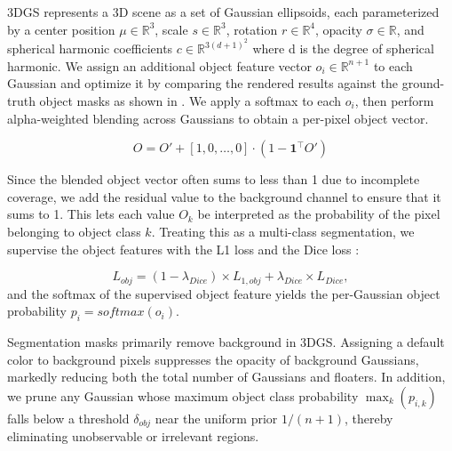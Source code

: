\ac{3DGS} represents a 3D scene as a set of Gaussian ellipsoids, each parameterized by a center position $\mu \in \mathbb{R}^{3}$, scale $s \in \mathbb{R}^{3}$, rotation $r \in \mathbb{R}^{4}$, opacity $\sigma \in \mathbb{R}$, and spherical harmonic coefficients $c \in \mathbb{R}^{3(d+1)^2}$ where d is the degree of spherical harmonic. We assign an additional object feature vector $o_i \in \mathbb{R}^{n+1}$ to each Gaussian and optimize it by comparing the rendered results against the ground-truth object masks as shown in . We apply a softmax to each $o_i$, then perform alpha-weighted blending across Gaussians to obtain a per-pixel object vector. 

{\small
\begin{equation}
O=O' + \left[1, 0, \dots, 0 \right] \cdot \left(1 - \mathbf{1}^\top O' \right)
\end{equation}
}

Since the blended object vector often sums to less than 1 due to incomplete coverage, we add the residual value to the background channel to ensure that it sums to 1. This lets each value $O_{k}$ be interpreted as the probability of the pixel belonging to object class $k$. Treating this as a multi-class segmentation, we supervise the object features with the L1 loss and the Dice loss \cite{sudre2017generalised}:

{\small
\begin{equation}
L_{obj} = (1-\lambda_{Dice}) \times L_{1, obj} + \lambda_{Dice} \times L_{Dice},
\end{equation}
}
and the softmax of the supervised object feature yields the per-Gaussian object probability $p_i = softmax(o_i)$.

Segmentation masks primarily remove background in \ac{3DGS}. Assigning a default color to background pixels suppresses the opacity of background Gaussians, markedly reducing both the total number of Gaussians and floaters. 
In addition, we prune any Gaussian whose maximum object class probability $\max_{k}(p_{i,k})$ falls below a threshold $\delta_{obj}$ near the uniform prior $1/(n+1)$, thereby eliminating unobservable or irrelevant regions.

